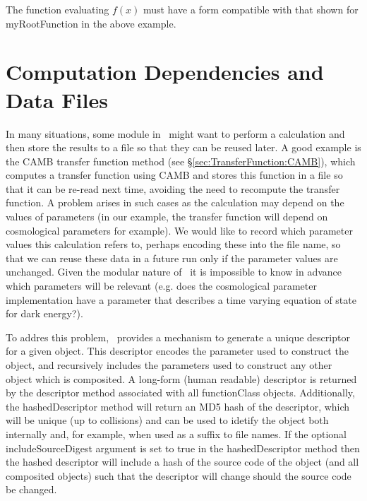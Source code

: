 The function evaluating $f(x)$ must have a form compatible with that shown for {\normalfont \ttfamily myRootFunction} in the above example.

\section{Computation Dependencies and Data Files}\label{sec:codeUniqueLabels}

In many situations, some module in \glc\ might want to perform a calculation and then store the results to a file so that they can be reused later. A good example is the {\normalfont \ttfamily CAMB} transfer function method (see \S\ref{sec:TransferFunction:CAMB}), which computes a transfer function using {\normalfont \scshape CAMB} and stores this function in a file so that it can be re-read next time, avoiding the need to recompute the transfer function. A problem arises in such cases as the calculation may depend on the values of parameters (in our example, the transfer function will depend on cosmological parameters for example). We would like to record which parameter values this calculation refers to, perhaps encoding these into the file name, so that we can reuse these data in a future run only if the parameter values are unchanged. Given the modular nature of \glc\ it is impossible to know in advance which parameters will be relevant (e.g. does the cosmological parameter implementation have a parameter that describes a time varying equation of state for dark energy?). 

To addres this problem, \glc\ provides a mechanism to generate a unique descriptor for a given object. This descriptor encodes the parameter used to construct the object, and recursively includes the parameters used to construct any other object which is composited. A long-form (human readable) descriptor is returned by the {\normalfont \ttfamily descriptor} method associated with all {\normalfont \ttfamily functionClass} objects. Additionally, the {\normalfont \ttfamily hashedDescriptor} method will return an MD5 hash of the descriptor, which will be unique (up to collisions) and can be used to idetify the object both internally and, for example, when used as a suffix to file names. If the optional {\normalfont \ttfamily includeSourceDigest} argument is set to true in the {\normalfont \ttfamily hashedDescriptor} method then the hashed descriptor will include a hash of the source code of the object (and all composited objects) such that the descriptor will change should the source code be changed.

